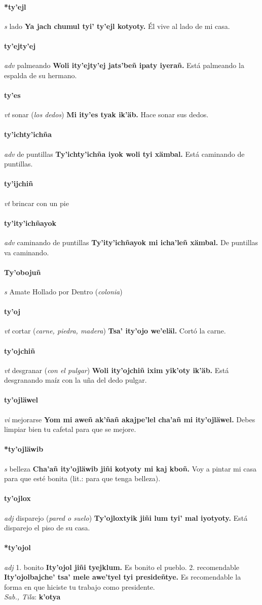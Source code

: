 \documentclass{scrbook}
\newcommand{\entry}[1]{\paragraph{#1}}
\newcommand{\onedefinition}[1]{#1.}
\newcommand{\partofspeech}[1]{\textit{#1}}
\newcommand{\spanishtranslation}[1]{#1}
\newcommand{\clarification}[1]{(\textit{#1})}
\newcommand{\cholexample}[1]{\textbf{#1}}
\newcommand{\exampletranslation}[1]{#1}
\newcommand{\dialectvariant}[1]{\\\textit{#1}:}
\newcommand{\dialectword}[1]{\textbf{#1}}
\begin{document}
\begin{multicols}{2}
\entry{*ty'ejl}
\partofspeech{s}
\spanishtranslation{lado}
\cholexample{Ya jach chumul tyi' ty'ejl kotyoty.}
\exampletranslation{Él vive al lado de mi casa.}

\entry{ty'ejty'ej}
\partofspeech{adv}
\spanishtranslation{palmeando}
\cholexample{Woli ity'ejty'ej jats'beñ ipaty iyerañ.}
\exampletranslation{Está palmeando la espalda de su hermano.}

\entry{ty'es}
\partofspeech{vt}
\spanishtranslation{sonar}
\clarification{los dedos}
\cholexample{Mi ity'es tyak ik'äb.}
\exampletranslation{Hace sonar sus dedos.}

\entry{ty'ichty'ichña}
\partofspeech{adv}
\spanishtranslation{de puntillas}
\cholexample{Ty'ichty'ichña iyok woli tyi xämbal.}
\exampletranslation{Está caminando de puntillas.}

\entry{ty'ijchiñ}
\partofspeech{vt}
\spanishtranslation{brincar con un pie}

\entry{ty'ity'ichñayok}
\partofspeech{adv}
\spanishtranslation{caminando de puntillas}
\cholexample{Ty'ity'ichñayok mi icha'leñ xämbal.}
\exampletranslation{De puntillas va caminando.}

\entry{Ty'obojuñ}
\partofspeech{s}
\spanishtranslation{Amate Hollado por Dentro}
\clarification{colonia}

\entry{ty'oj}
\partofspeech{vt}
\spanishtranslation{cortar}
\clarification{carne, piedra, madera}
\cholexample{Tsa' ity'ojo we'eläl.}
\exampletranslation{Cortó la carne.}

\entry{ty'ojchiñ}
\partofspeech{vt}
\spanishtranslation{desgranar}
\clarification{con el pulgar}
\cholexample{Woli ity'ojchiñ ixim yik'oty ik'äb.}
\exampletranslation{Está desgranando maíz con la uña del dedo pulgar.}

\entry{ty'ojläwel}
\partofspeech{vi}
\spanishtranslation{mejorarse}
\cholexample{Yom mi aweñ ak'ñañ akajpe'lel cha'añ mi ity'ojläwel.}
\exampletranslation{Debes limpiar bien tu cafetal para que se mejore.}

\entry{*ty'ojläwib}
\partofspeech{s}
\spanishtranslation{belleza}
\cholexample{Cha'añ ity'ojläwib jiñi kotyoty mi kaj kboñ.}
\exampletranslation{Voy a pintar mi casa para que esté bonita (lit.: para que tenga belleza).}

\entry{ty'ojlox}
\partofspeech{adj}
\spanishtranslation{disparejo}
\clarification{pared o suelo}
\cholexample{Ty'ojloxtyik jiñi lum tyi' mal iyotyoty.}
\exampletranslation{Está disparejo el piso de su casa.}

\entry{*ty'ojol}
\partofspeech{adj}
\onedefinition{1}
\spanishtranslation{bonito}
\cholexample{Ity'ojol jiñi tyejklum.}
\exampletranslation{Es bonito el pueblo.}
\onedefinition{2}
\spanishtranslation{recomendable}
\cholexample{Ity'ojolbajche' tsa' mele awe'tyel tyi presideñtye.}
\exampletranslation{Es recomendable la forma en que hiciste tu trabajo como presidente.}
\dialectvariant{Sab., Tila}
\dialectword{k'otya}


\end{multicols}
\end{document}
